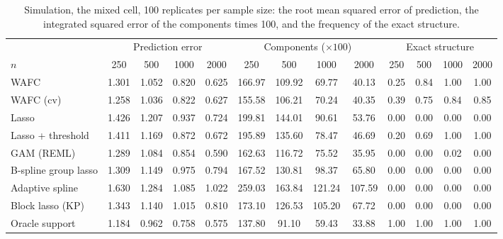 \begin{table}[tp]
\color{colR1}
\caption{Simulation, the mixed cell, 100 replicates per sample size: the root mean squared error of prediction, the integrated squared error of the components times 100, and the frequency of the exact structure.}
\label{tab:sim-sizes-mixed}
\centering
\footnotesize
\setlength{\tabcolsep}{3pt}
\begin{tabular}{l cccc cccc cccc}
\hline
 & \multicolumn{4}{c}{Prediction error} & \multicolumn{4}{c}{Components ($\times 100$)} & \multicolumn{4}{c}{Exact structure} \\
$n$ & 250 & 500 & 1000 & 2000 & 250 & 500 & 1000 & 2000 & 250 & 500 & 1000 & 2000 \\
\hline
WAFC & 1.301 & 1.052 & 0.820 & 0.625 & 166.97 & 109.92 & 69.77 & 40.13 & 0.25 & 0.84 & 1.00 & 1.00 \\
WAFC (cv) & 1.258 & 1.036 & 0.822 & 0.627 & 155.58 & 106.21 & 70.24 & 40.35 & 0.39 & 0.75 & 0.84 & 0.85 \\
Lasso & 1.426 & 1.207 & 0.937 & 0.724 & 199.81 & 144.01 & 90.61 & 53.76 & 0.00 & 0.00 & 0.00 & 0.00 \\
Lasso + threshold & 1.411 & 1.169 & 0.872 & 0.672 & 195.89 & 135.60 & 78.47 & 46.69 & 0.20 & 0.69 & 1.00 & 1.00 \\
GAM (REML) & 1.289 & 1.084 & 0.854 & 0.590 & 162.63 & 116.72 & 75.52 & 35.95 & 0.00 & 0.00 & 0.02 & 0.00 \\
B-spline group lasso & 1.309 & 1.149 & 0.975 & 0.794 & 167.52 & 130.81 & 98.37 & 65.80 & 0.00 & 0.00 & 0.00 & 0.00 \\
Adaptive spline & 1.630 & 1.284 & 1.085 & 1.022 & 259.03 & 163.84 & 121.24 & 107.59 & 0.00 & 0.00 & 0.00 & 0.00 \\
Block lasso (KP) & 1.343 & 1.140 & 1.015 & 0.810 & 173.10 & 126.53 & 105.20 & 67.72 & 0.00 & 0.00 & 0.00 & 0.00 \\
Oracle support & 1.184 & 0.962 & 0.758 & 0.575 & 137.80 & 91.10 & 59.43 & 33.88 & 1.00 & 1.00 & 1.00 & 1.00 \\
\hline
\end{tabular}
\end{table}

